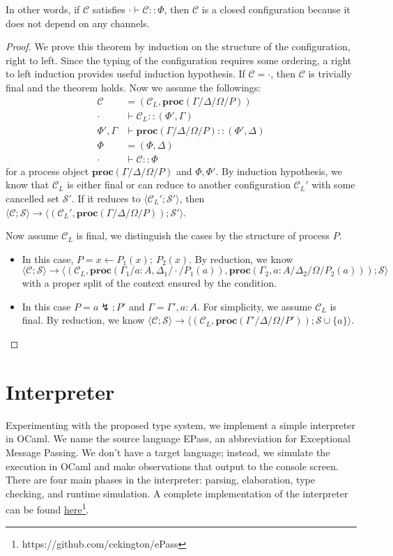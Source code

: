 \documentclass[12pt, openany]{memoir}
\newcommand*{\cancel}[1]{#1 \lightning}
\newcommand*{\spawn}[3]{#3 \leftarrow #1(#3);\ #2(#3)}
\newcommand*{\procObj}[4]{\textbf{proc}(#1/#2/#3/#4)}
\newcommand*{\config}[0]{\mathcal{C}}
\newcommand*{\cancelSet}[0]{\mathcal{S}}
\begin{document}
In other words, if $\config$ satisfies $\cdot \vdash \config :: \Phi$, then $\config$ is a closed configuration because it does not depend on any channels.
\begin{proof}
  We prove this theorem by induction on the structure of the configuration, right to left.
  Since the typing of the configuration requires some ordering, a right to left induction provides useful induction hypothesis.
  If $\config = \cdot$, then $\config$ is trivially final and the theorem holds.
  Now we assume the followings: 
  \begin{align*}
    \config &= (\config_L, \procObj{\Gamma}{\Delta}{\Omega}{P}) \\
    \cdot & \vdash \config_L :: (\Phi', \Gamma) \\
    \Phi', \Gamma & \vdash \procObj{\Gamma}{\Delta}{\Omega}{P} :: (\Phi', \Delta) \\
    \Phi & = (\Phi, \Delta) \\
    \cdot & \vdash \config :: \Phi
  \end{align*}
  for a process object $\procObj{\Gamma}{\Delta}{\Omega}{P}$ and $\Phi, \Phi'$. By induction hypothesis,
  we know that $\config_L$ is either final or can reduce to another configuration $\config_L'$ with some cancelled set $\cancelSet'$.
  If it reduces to $\langle \config_L'; \cancelSet' \rangle$, then $\langle \config; \cancelSet \rangle \longrightarrow 
  \langle (\config_L', \procObj{\Gamma}{\Delta}{\Omega}{P}); \cancelSet' \rangle$.
  
  Now assume $\config_L$ is final, we distinguish the cases by the structure of process $P$.
  \begin{itemize}
    \item [\ruleref{cut}] In this case, $P = \spawn{P_1}{P_2}{x}$. By reduction, we know 
    $\langle \config; \cancelSet \rangle \longrightarrow
    \langle (\config_L, \procObj{\Gamma_1}{a : A, \Delta_1}{\cdot}{P_1(a)}, \procObj{\Gamma_2, a : A}{\Delta_2}{\Omega}{P_2(a)}); \cancelSet \rangle$
    with a proper split of the context ensured by the condition.
    \item [\ruleref{weakenL}] In this case $P = \cancel{a}; P'$ and $\Gamma = \Gamma', a : A$. 
    For simplicity, we assume $\config_L$ is final.
    By reduction, we know $\langle \config; \cancelSet \rangle \longrightarrow \langle (\config_L, \procObj{\Gamma'}{\Delta}{\Omega}{P'}); \cancelSet \cup \{a\} \rangle$.
  \end{itemize}
\end{proof}
\chapter{Interpreter}
Experimenting with the proposed type system, we implement a simple interpreter in OCaml. 
We name the source language EPass, an abbreviation for Exceptional Message Passing. 
We don't have a target language; instead, we simulate the execution in OCaml and make observations that output to the console screen. 
There are four main phases in the interpreter: parsing, elaboration, type checking, and runtime simulation.
A complete implementation of the interpreter can be found \href{https://github.com/cekington/ePass}{here}\footnote{https://github.com/cekington/ePass}.
\end{document}
